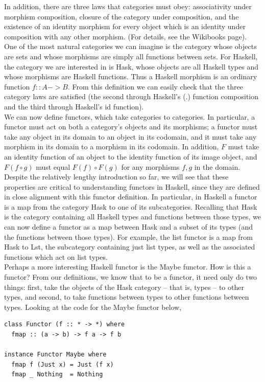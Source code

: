 \documentclass[journal]{IEEEtran}
\begin{document}
In addition, there are three laws that categories must obey: associativity under morphism composition, closure of the category under composition, and the existence of an identity morphism for every object which is an identity under composition with any other morphism. (For details, see the Wikibooks page).\\

One of the most natural categories we can imagine is the category whose objects are sets and whose morphisms are simply all functions between sets. For Haskell, the category we are interested in is Hask, whose objects are all Haskell types and whose morphisms are Haskell functions. Thus a Haskell morphism is an ordinary function $f :: A -> B$. From this definition we can easily check that the three category laws are satisfied (the second through Haskell's (.) function composition and the third through Haskell's id function).\\

We can now define functors, which take categories to categories. In particular, a functor must act on both a category's objects and its morphisms; a functor must take any object in its domain to an object in its codomain, and it must take any morphism in its domain to a morphism in its codomain. In addition, $F$ must take an identity function of an object to the identity function of its image object, and $F(f \circ g)$ must equal $F(f) \circ F(g)$ for any morphisms $f, g$ in the domain.\\

Despite the relatively lengthy introduction so far, we will see that these properties are critical to understanding functors in Haskell, since they are defined in close alignment with this functor definition. In particular, in Haskell a functor is a map from the category Hask to one of its subcategories. Recalling that Hask is the category containing all Haskell types and functions between those types, we can now define a functor as a map between Hask and a subset of its types (and the functions between those types). For example, the list functor is a map from Hask to Lst, the subcategory containing just list types, as well as the associated functions which act on list types. \\

Perhaps a more interesting Haskell functor is the Maybe functor. How is this a functor? From our definitions, we know that to be a functor, it need only do two things: first, take the objects of the Hask category – that is, types – to other types, and second, to take functions between types to other functions between types. Looking at the code for the Maybe functor below,
\begin{verbatim}
class Functor (f :: * -> *) where
  fmap :: (a -> b) -> f a -> f b

instance Functor Maybe where
  fmap f (Just x) = Just (f x)
  fmap _ Nothing  = Nothing

\end{verbatim}
\end{document}
